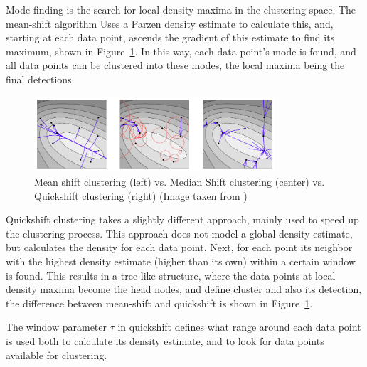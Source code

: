 Mode finding is the search for local density maxima in the clustering space. The mean-shift algorithm \cite{cheng1995mean} Uses a Parzen density estimate to calculate this, and, starting at each data point, ascends the gradient of this estimate to find its maximum, shown in Figure~\ref{fig:ms_qs}. In this way, each data point's mode is found, and all data points can be clustered into these modes, the local maxima being the final detections.

\begin{figure}[hbt]
    \centering
    \includegraphics[width=0.8\textwidth]{MeanshiftMedianshiftQuickshift}
    \caption{Mean shift clustering (left) vs. Median Shift clustering (center) vs. Quickshift clustering (right) (Image taken from \cite{vedaldi2008quick})}
    \label{fig:ms_qs}
\end{figure}

Quickshift clustering takes a slightly different approach, mainly used to speed up the clustering process. \cite{vedaldi2008quick} This approach does not model a global density estimate, but calculates the density for each data point. Next, for each point its neighbor with the highest density estimate (higher than its own) within a certain window is found. This results in a tree-like structure, where the data points at local density maxima become the head nodes, and define cluster and also its detection, the difference between mean-shift and quickshift is shown in Figure~\ref{fig:ms_qs}.

The window parameter $\tau$ in quickshift defines what range around each data point is used both to calculate its density estimate, and to look for data points available for clustering.



